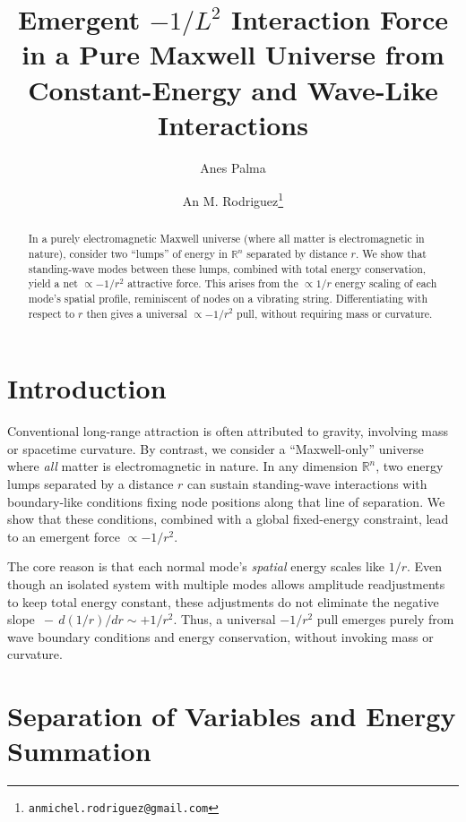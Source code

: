 \documentclass[12pt]{article}
\begin{document}
\title{\textbf{Emergent \texorpdfstring{$-\!1/L^{2}$}{-1/r\^{}2} Interaction Force in a Pure Maxwell Universe from\\
Constant-Energy and Wave-Like Interactions}}
\author{
Anes Palma \and
An M. Rodriguez\thanks{\texttt{anmichel.rodriguez@gmail.com}}
}
\date{}
\maketitle

\begin{abstract}
In a purely electromagnetic Maxwell universe (where all matter is electromagnetic in nature), consider two ``lumps'' of energy in \(\mathbb{R}^n\) separated by distance \(r\). We show that standing-wave modes between these lumps, combined with total energy conservation, yield a net \(\propto -1/r^2\) attractive force. This arises from the \(\propto 1/r\) energy scaling of each mode’s spatial profile, reminiscent of nodes on a vibrating string. Differentiating with respect to \(r\) then gives a universal \(\propto -1/r^2\) pull, without requiring mass or curvature.
\end{abstract}

\section{Introduction}
Conventional long-range attraction is often attributed to gravity, involving mass or spacetime curvature. By contrast, we consider a ``Maxwell-only'' universe where \emph{all} matter is electromagnetic in nature. In any dimension \(\mathbb{R}^n\), two energy lumps separated by a distance \(r\) can sustain standing-wave interactions with boundary-like conditions fixing node positions along that line of separation. We show that these conditions, combined with a global fixed-energy constraint, lead to an emergent force \(\propto -1/r^2\).

The core reason is that each normal mode’s \emph{spatial} energy scales like \(1/r\). Even though an isolated system with multiple modes allows amplitude readjustments to keep total energy constant, these adjustments do not eliminate the negative slope \(\,-\,d(1/r)/dr \sim +1/r^2\). Thus, a universal \(-1/r^2\) pull emerges purely from wave boundary conditions and energy conservation, without invoking mass or curvature.

\section{Separation of Variables and Energy Summation}
\end{document}
